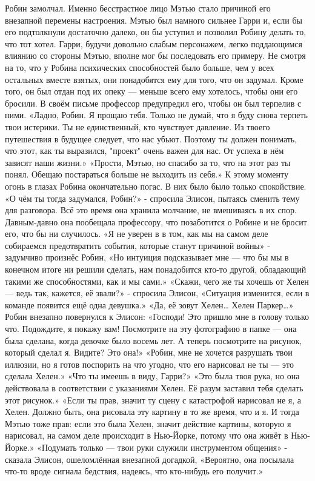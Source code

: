 \documentclass[a4paper,12pt]{book}
\begin{document}
	Робин замолчал. Именно бесстрастное лицо Мэтью стало причиной его внезапной перемены настроения.
	Мэтью был намного сильнее Гарри и, если бы его подтолкнули достаточно далеко, он бы уступил и позволил Робину делать то, что тот хотел. Гарри, будучи довольно слабым персонажем, легко поддающимся влиянию со стороны Мэтью, вполне мог бы последовать его примеру.
	Не смотря на то, что у Робина психических способностей было больше, чем у всех остальных вместе взятых, они понадобятся ему для того, что он задумал. Кроме того, он был отдан под их опеку — меньше всего ему хотелось, чтобы они его бросили. В своём письме профессор предупредил его, чтобы он был терпелив с ними.
	«Ладно, Робин. Я прощаю тебя. Только не думай, что я буду снова терпеть твои истерики. Ты не единственный, кто чувствует давление. Из твоего путешествия в будущее следует, что нас убьют. Поэтому ты должен понимать, что этот, как ты выразился, "проект" очень важен для нас. От успеха в нём зависят наши жизни.»
	«Прости, Мэтью, но спасибо за то, что на этот раз ты понял. Обещаю постараться больше не выходить из себя.»
	К этому моменту огонь в глазах Робина окончательно погас. В них было было только спокойствие.
	«О чём ты тогда задумался, Робин?» - спросила Элисон, пытаясь сменить тему для разговора. Всё это время она хранила молчание, не вмешиваясь в их спор. Давным-давно она пообещала профессору, что позаботится о Робине и не бросит его, что бы ни случилось.
	«Я не уверен в в том, как мы на самом деле собираемся предотвратить события, которые станут причиной войны» - задумчиво произнёс Робин,
	«Но интуиция подсказывает мне — что бы мы в конечном итоге ни решили сделать, нам понадобится кто-то другой, обладающий такими же способностями, как и мы сами.»
	«Скажи, чего же ты хочешь от Хелен — ведь так, кажется, её звали?» - спросила Элисон,
	«Ситуация изменится, если в команде появится ещё одна девушка.»
	«Да, её зовут Хелен…  Хелен Паркер…»
	Робин внезапно повернулся к Элисон:
	«Господи! Это пришло мне в голову только что. Подождите, я покажу вам! Посмотрите на эту фотографию в папке — она была сделана, когда девочке было восемь лет. А теперь посмотрите на рисунок, который сделал я. Видите? Это она!»
	«Робин, мне не хочется разрушать твои иллюзии, но я готов поспорить на что угодно, что его нарисовал не ты — это сделала Хелен.»
	«Что ты имеешь в виду, Гарри?»
	«Это была твоя рука, но она действовала в соответствии с указаниями Хелен. Её разум заставил тебя сделать этот рисунок.»
	«Если ты прав, значит ту сцену с катастрофой нарисовал не я, а Хелен. Должно быть, она рисовала эту картину в то же время, что и я. И тогда Мэтью тоже прав: если это была Хелен, значит действие картины, которую я нарисовал, на самом деле происходит в Нью-Йорке, потому что она живёт в Нью-Йорке.»
	«Подумать только — твои руки служили инструментом общения» - сказала Элисон, ошеломлённая внезапной догадкой,
	«Вероятно, она посылала что-то вроде сигнала бедствия, надеясь, что кто-нибудь его получит.»
\end{document}
